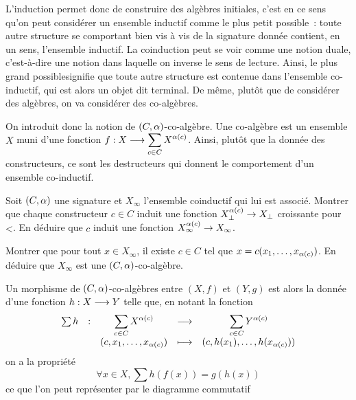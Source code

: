 \begin{problem}[La coinduction]
  \noindent
  L'induction permet donc de construire des algèbres initiales, c'est en ce
  sens qu'on peut considérer un ensemble inductif comme \og le plus petit
  possible\fg~: toute autre structure se comportant bien vis à vis de la
  signature donnée contient, en un sens, l'ensemble inductif. La coinduction
  peut se voir comme une notion duale, c'est-à-dire une notion dans laquelle
  on inverse le sens de lecture. Ainsi, \og le plus grand possible\fg signifie
  que toute autre structure est contenue dans l'ensemble co-inductif, qui est
  alors un objet dit terminal. De même, plutôt que de considérer des algèbres,
  on va considérer des co-algèbres.
  
  \noindent
  On introduit donc la notion de $(C,\alpha)$-co-algèbre. Une co-algèbre est
  un ensemble $X$ muni d'une fonction
  $f : \displaystyle X \longrightarrow \sum_{c \in C}X^{\alpha(c)}$.
  Ainsi, plutôt que la donnée des constructeurs, ce sont les destructeurs qui
  donnent le comportement d'un ensemble co-inductif.
  
  \begin{pbQuest}[resume]
  \item Soit $(C,\alpha)$ une signature et $X_\infty$ l'ensemble coinductif qui
    lui est associé. Montrer que chaque constructeur $c \in C$ induit une
    fonction $X_\bot^{\alpha(c)} \to X_\bot$ croissante pour $\mathord{<}$.
    En déduire que
    $c$ induit une fonction $X_\infty^{\alpha(c)} \to X_\infty$.
  \item Montrer que pour tout $x \in X_\infty$, il existe $c \in C$ tel que
    $x = c(x_1,\ldots,x_{\alpha(c)})$. En déduire que $X_\infty$ est une
    $(C,\alpha)$-co-algèbre.
  \end{pbQuest}

  \noindent
  Un morphisme de $(C,\alpha)$-co-algèbres entre $(X,f)$ et $(Y,g)$ est alors
  la donnée d'une fonction $h : \displaystyle X \longrightarrow Y$ telle que, en notant la
  fonction
  \[\makeFun{\sum h}{\sum_{c \in C}X^{\arite(c)}}{\sum_{c \in C}Y^{\arite(c)}}
            {(c,x_1,\ldots,x_{\arite(c)})}{(c,h(x_1),\ldots,h(x_{\arite(c)}))}\]
  on a la propriété
  \[\forall x \in X, \sum h (f(x)) = g(h(x))\]
  ce que l'on peut représenter par le diagramme commutatif
  \begin{center}
  \end{center}
  

\end{problem}
